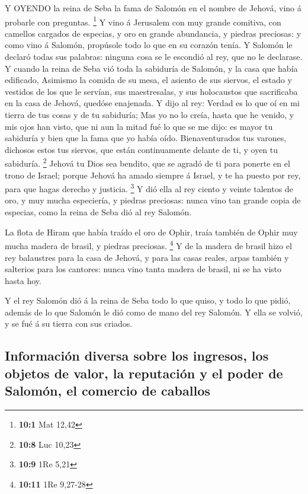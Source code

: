  Y OYENDO la reina de Seba la fama de Salomón en el nombre
de Jehová, vino á probarle con preguntas. \footnote{\textbf{10:1} Mat
  12,42}  Y vino á Jerusalem con muy grande comitiva, con
camellos cargados de especias, y oro en grande abundancia, y piedras
preciosas: y como vino á Salomón, propúsole todo lo que en su corazón
tenía.  Y Salomón le declaró todas sus palabras: ninguna
cosa se le escondió al rey, que no le declarase.  Y cuando
la reina de Seba vió toda la sabiduría de Salomón, y la casa que había
edificado,  Asimismo la comida de su mesa, el asiento de sus
siervos, el estado y vestidos de los que le servían, sus maestresalas, y
sus holocaustos que sacrificaba en la casa de Jehová, quedóse enajenada.
 Y dijo al rey: Verdad es lo que oí en mi tierra de tus
cosas y de tu sabiduría;  Mas yo no lo creía, hasta que he
venido, y mis ojos han visto, que ni aun la mitad fué lo que se me dijo:
es mayor tu sabiduría y bien que la fama que yo había oído. 
Bienaventurados tus varones, dichosos estos tus siervos, que están
continuamente delante de ti, y oyen tu sabiduría. \footnote{\textbf{10:8}
  Luc 10,23}  Jehová tu Dios sea bendito, que se agradó de
ti para ponerte en el trono de Israel; porque Jehová ha amado siempre á
Israel, y te ha puesto por rey, para que hagas derecho y justicia.
\footnote{\textbf{10:9} 1Re 5,21}  Y dió ella al rey ciento
y veinte talentos de oro, y muy mucha especiería, y piedras preciosas:
nunca vino tan grande copia de especias, como la reina de Seba dió al
rey Salomón.

 La flota de Hiram que había traído el oro de Ophir, traía
también de Ophir muy mucha madera de brasil, y piedras preciosas.
\footnote{\textbf{10:11} 1Re 9,27-28}  Y de la madera de
brasil hizo el rey balaustres para la casa de Jehová, y para las casas
reales, arpas también y salterios para los cantores: nunca vino tanta
madera de brasil, ni se ha visto hasta hoy.

 Y el rey Salomón dió á la reina de Seba todo lo que quiso,
y todo lo que pidió, además de lo que Salomón le dió como de mano del
rey Salomón. Y ella se volvió, y se fué á su tierra con sus criados.

\hypertarget{informaciuxf3n-diversa-sobre-los-ingresos-los-objetos-de-valor-la-reputaciuxf3n-y-el-poder-de-salomuxf3n-el-comercio-de-caballos}{%
\subsection{Información diversa sobre los ingresos, los objetos de
valor, la reputación y el poder de Salomón, el comercio de
caballos}\label{informaciuxf3n-diversa-sobre-los-ingresos-los-objetos-de-valor-la-reputaciuxf3n-y-el-poder-de-salomuxf3n-el-comercio-de-caballos}}

